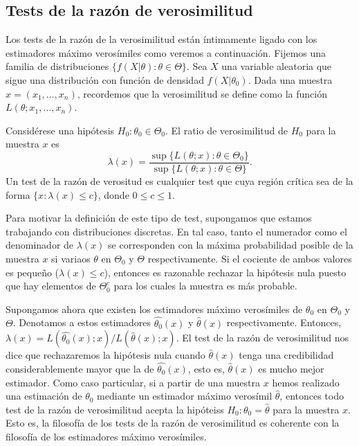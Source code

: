 \documentclass{article}
\begin{document}
\subsection{Tests de la razón de verosimilitud}

Los tests de la razón de la verosimilitud están íntimamente ligado con los estimadores máximo verosímiles como veremos a continuación. Fijemos una familia de distribuciones $\{f(X|\theta): \theta \in \Theta\}$. Sea $X$ una variable aleatoria que sigue una distribución con función de densidad $f(X | \theta_0)$. Dada una muestra $x = (x_1, \ldots, x_n)$, recordemos que la verosimilitud se define como la función
$L(\theta;x_1, \ldots, x_n)$.

\begin{definition}
    Considérese una hipótesis $H_0 : \theta_0 \in \Theta_0$. El ratio de verosimilitud de $H_0$ para la muestra $x$ es
    \[\lambda(x) = \frac{\sup\{L(\theta; x): \theta \in \Theta_0\}}{\sup\{L(\theta; x): \theta \in \Theta\}}. \]
     Un test de la razón de verositud es cualquier test que cuya región crítica sea de la forma $\{x : \lambda(x) \le c\}$, donde $0 \le c \le 1$.
\end{definition}

Para motivar la definición de este tipo de test, supongamos que estamos trabajando con distribuciones discretas. En tal caso, tanto el numerador como el denominador de $\lambda(x)$ se corresponden con la máxima probabilidad posible de la muestra $x$ si variaos $\theta$ en $\Theta_0$ y $\Theta$ respectivamente. Si el cociente de ambos valores es pequeño ($\lambda(x) \le c$), entonces es razonable rechazar la hipótesis nula puesto que hay elementos de $\Theta_0^c$ para los cuales la muestra es más probable.

Supongamos ahora que existen los estimadores máximo verosímiles de $\theta_0$ en $\Theta_0$ y $\Theta$. Denotamos a estos estimadores $\hat{\theta_0}(x)$ y $\hat{\theta}(x)$ respectivamente. Entonces, $\lambda(x) = L(\hat{\theta_0}(x);x) / L(\hat{\theta}(x);x)$. El test de la razón de verosimilitud nos dice que rechazaremos la hipótesis nula cuando $\hat{\theta}(x)$  tenga una credibilidad considerablemente mayor que la de $\hat{\theta_0}(x)$, esto es, $\hat{\theta}(x)$ es mucho mejor estimador. Como caso particular, si a partir de una muestra $x$ hemos realizado una estimación de $\theta_0$ mediante un estimador máximo verosímil $\hat{\theta}$, entonces todo test de la razón de verosimilitud acepta la hipóteiss $H_0: \theta_0 = \hat{\theta}$ para la muestra $x$. Esto es, la filosofía de los tests de la razón de verosimilitud es coherente con la filosofía de los estimadores máximo verosímiles.
\end{document}
